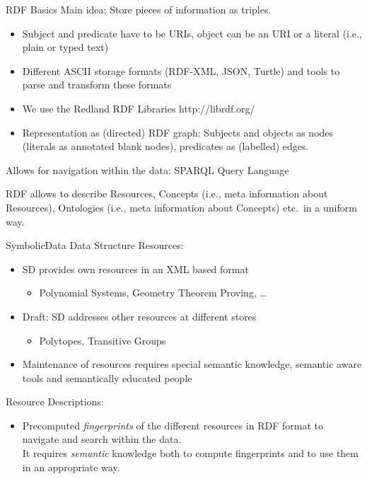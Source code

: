 \documentclass{beamer}
\begin{document}
\begin{frame}{RDF Basics}{}
Main idea: Store pieces of information as triples.
\begin{itemize}
\item Subject and predicate have to be URIs, object can be an URI or a literal
  (i.e., plain or typed text)
\item Different ASCII storage formats (RDF-XML, JSON, Turtle) and tools to
  parse and transform these formats
\item We use the Redland RDF Libraries http://librdf.org/
\item Representation as (directed) RDF graph: Subjects and objects as nodes
  (literals as annotated blank nodes), predicates as (labelled) edges.
\end{itemize}
Allows for navigation within the data: SPARQL Query Language

RDF allows to describe Resources, Concepts (i.e., meta information about
Resources), Ontologies (i.e., meta information about Concepts) etc.\ in a
uniform way.
\end{frame}

\begin{frame}{SymbolicData Data Structure}{}
Resources:
\begin{itemize}
\item SD provides own resources in an XML based format
\begin{itemize}
\item Polynomial Systems, Geometry Theorem Proving, \ldots
\end{itemize}
\item Draft: SD addresses other resources at different stores
\begin{itemize}
\item Polytopes, Transitive Groups
\end{itemize}
\item Maintenance of resources requires special semantic knowledge, semantic
  aware tools and semantically educated people
\end{itemize}
Resource Descriptions: 
\begin{itemize}
\item Precomputed \emph{fingerprints} of the different resources in RDF format
  to navigate and search within the data.\\ It requires \emph{semantic}
  knowledge both to compute fingerprints and to use them in an appropriate
  way.
\end{itemize}
\end{frame}
\end{document}
